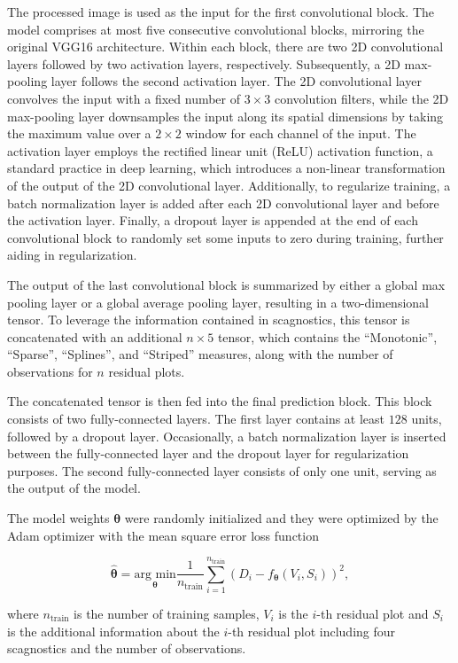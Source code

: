 \documentclass[]{interact}
\theoremstyle{plain}%
\theoremstyle{definition}
\theoremstyle{remark}
\begin{document}
The processed image is used as the input for the first convolutional
block. The model comprises at most five consecutive convolutional
blocks, mirroring the original VGG16 architecture. Within each block,
there are two 2D convolutional layers followed by two activation layers,
respectively. Subsequently, a 2D max-pooling layer follows the second
activation layer. The 2D convolutional layer convolves the input with a
fixed number of \(3 \times 3\) convolution filters, while the 2D
max-pooling layer downsamples the input along its spatial dimensions by
taking the maximum value over a \(2 \times 2\) window for each channel
of the input. The activation layer employs the rectified linear unit
(ReLU) activation function, a standard practice in deep learning, which
introduces a non-linear transformation of the output of the 2D
convolutional layer. Additionally, to regularize training, a batch
normalization layer is added after each 2D convolutional layer and
before the activation layer. Finally, a dropout layer is appended at the
end of each convolutional block to randomly set some inputs to zero
during training, further aiding in regularization.

The output of the last convolutional block is summarized by either a
global max pooling layer or a global average pooling layer, resulting in
a two-dimensional tensor. To leverage the information contained in
scagnostics, this tensor is concatenated with an additional
\(n \times 5\) tensor, which contains the ``Monotonic'', ``Sparse'',
``Splines'', and ``Striped'' measures, along with the number of
observations for \(n\) residual plots.

The concatenated tensor is then fed into the final prediction block.
This block consists of two fully-connected layers. The first layer
contains at least \(128\) units, followed by a dropout layer.
Occasionally, a batch normalization layer is inserted between the
fully-connected layer and the dropout layer for regularization purposes.
The second fully-connected layer consists of only one unit, serving as
the output of the model.

The model weights \(\boldsymbol{\theta}\) were randomly initialized and
they were optimized by the Adam optimizer \citep{kingma2014adam} with
the mean square error loss function

\[\hat{\boldsymbol{\theta}} = \underset{\boldsymbol{\theta}}{\text{arg min}}\frac{1}{n_{\text{train}}}\sum_{i=1}^{n_{\text{train}}}(D_i - f_{\boldsymbol{\theta}}(V_i, S_i))^2,\]

\noindent where \(n_{\text{train}}\) is the number of training samples,
\(V_i\) is the \(i\)-th residual plot and \(S_i\) is the additional
information about the \(i\)-th residual plot including four scagnostics
and the number of observations.
\end{document}
